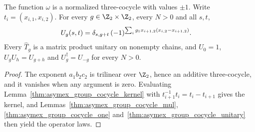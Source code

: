\begin{lemma}
    \label{thm:asymex_group_cocycle_klein}
    \leanok
    The function $\omega$ is a normalized three-cocycle with values $\pm1$.
    Write $t_i=(x_{i,1},x_{i,2})$. For every $g\in\Z_2\times\Z_2$, every
    $N>0$ and all $s,t$,
    \begin{align}
        U_g(s,t)
         & =\delta_{s,g+t}\,
        (-1)^{\sum_ig_1x_{i+1,2}(x_{i,2}-x_{i+1,2})}.
        \notag
    \end{align}
    Every $\hat T_g$ is a matrix product unitary on nonempty chains, and
    $U_0=1$, $U_gU_h=U_{g+h}$ and $U_g^\dagger=U_{-g}$ for every $N>0$.
\end{lemma}

\begin{proof}
    \leanok
    The exponent $a_1b_2c_2$ is trilinear over $\Z_2$, hence an additive
    three-cocycle, and it vanishes when any argument is zero. Evaluating
    Lemma~\ref{thm:asymex_group_cocycle_kernel} with
    $t_{i+1}^{-1}t_i=t_i-t_{i+1}$ gives the kernel, and
    Lemmas~\ref{thm:asymex_group_cocycle_mul},
    \ref{thm:asymex_group_cocycle_one}
    and~\ref{thm:asymex_group_cocycle_unitary} then yield the operator laws.
\end{proof}
